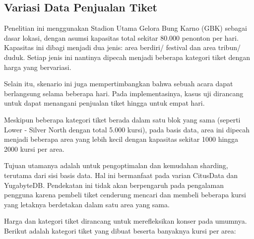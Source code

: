 \subsection{Variasi Data Penjualan Tiket}

Penelitian ini menggunakan Stadion Utama Gelora Bung Karno (GBK) sebagai dasar lokasi, dengan asumsi kapasitas total sekitar 80.000 penonton per hari. Kapasitas ini dibagi menjadi dua jenis: area berdiri/ festival dan area tribun/ duduk. Setiap jenis ini nantinya dipecah menjadi beberapa kategori tiket dengan harga yang bervariasi.

Selain itu, skenario ini juga mempertimbangkan bahwa sebuah acara dapat berlangsung selama beberapa hari. Pada implementasinya, kasus uji dirancang untuk dapat menangani penjualan tiket hingga untuk empat hari.

Meskipun beberapa kategori tiket berada dalam satu blok yang sama (seperti Lower - Silver North dengan total 5.000 kursi), pada basis data, area ini dipecah menjadi beberapa area yang lebih kecil dengan kapasitas sekitar 1000 hingga 2000 kursi per area.

Tujuan utamanya adalah untuk pengoptimalan dan kemudahan sharding, terutama dari sisi basis data. Hal ini bermanfaat pada varian CitusData dan YugabyteDB. Pendekatan ini tidak akan berpengaruh pada pengalaman pengguna karena pembeli tiket cenderung mencari dan membeli beberapa kursi yang letaknya berdetakan dalam satu area yang sama.

Harga dan kategori tiket dirancang untuk merefleksikan konser pada umumnya. Berikut adalah kategori tiket yang dibuat beserta banyaknya kursi per area:

